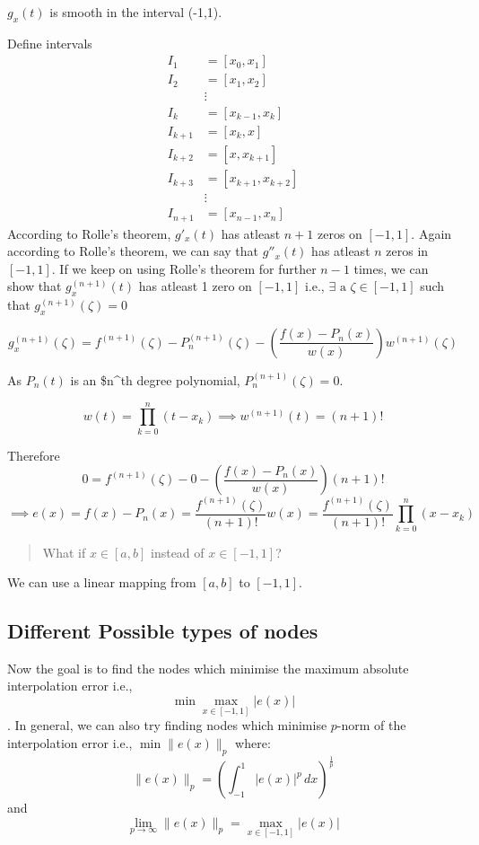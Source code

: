 \documentclass[
]{book}
\begin{document}
\(g_x(t)\) is smooth in the interval (-1,1).

Define intervals
\begin{align}
I_1     &= [x_0,x_1]\\
I_2     &= [x_1,x_2]\\
        &\vdots\\
I_k     &= [x_{k-1},x_k]\\
I_{k+1} &= [x_k,x]\\
I_{k+2} &=[x,x_{k+1}]\\
I_{k+3} &= [x_{k+1},x_{k+2}]\\
        &\vdots\\
I_{n+1} &= [x_{n-1},x_n]
\end{align}
According to Rolle's theorem, \(g'_x(t)\) has atleast \(n+1\) zeros on \([-1,1]\).
Again according to Rolle's theorem, we can say that \(g''_x(t)\) has atleast \(n\) zeros in \([-1,1]\). If we keep on using Rolle's theorem for further \(n-1\) times, we can show that \(g_x^{(n+1)}(t)\) has atleast 1 zero on \([-1,1]\) i.e., \(\exists \text{ a } \zeta\in[-1,1]\) such that \(g_x^{(n+1)}(\zeta)=0\)

\[g^{(n+1)}_x(\zeta) = f^{(n+1)}(\zeta)-P^{(n+1)}_n(\zeta)-\left(\frac{f(x)-P_n(x)}{w(x)}\right)w^{(n+1)}(\zeta)\]

As \(P_n(t)\) is an \$n\^{}th degree polynomial, \(P^{(n+1)}_n(\zeta)=0\).

\[w(t) = \prod_{k=0}^n(t-x_k)\implies w^{(n+1)}(t) = (n+1)!\]

Therefore \[0 = f^{(n+1)}(\zeta)-0 - \left(\frac{f(x)-P_n(x)}{w(x)}\right)(n+1)!\]
\[\implies e(x) = f(x)-P_n(x) = \frac{f^{(n+1)}(\zeta)}{(n+1)!}w(x)= \frac{f^{(n+1)}(\zeta)}{(n+1)!}\prod_{k=0}^n(x-x_k)\]

\begin{quote}
What if \(x\in[a,b]\) instead of \(x\in[-1,1]\)?
\end{quote}

We can use a linear mapping from \([a,b]\) to \([-1,1]\).

\hypertarget{different-possible-types-of-nodes}{%
\subsection{Different Possible types of nodes}\label{different-possible-types-of-nodes}}

Now the goal is to find the nodes which minimise the maximum absolute interpolation error i.e., \[\min \max_{x\in[-1,1]} |e(x)|\]. In general, we can also try finding nodes which minimise \(p\)-norm of the interpolation error i.e., \(\min \lVert e(x) \rVert_p\) where:
\[\lVert e(x) \rVert_p = \left( \int_{-1}^1 |e(x)|^p \, dx\right)^{\frac{1}{p}}\] and \[\lim_{p\to\infty} \lVert e(x) \rVert_p = \max_{x\in[-1,1]}|e(x)|\]
\end{document}
